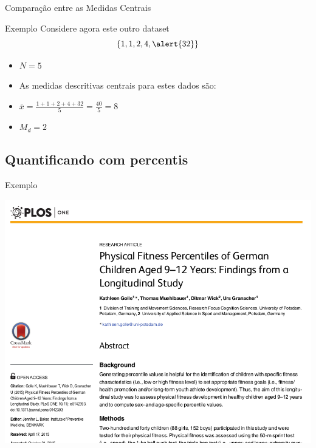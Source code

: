 \documentclass{beamer}
\begin{document}
\begin{frame}{\scriptsize Comparação entre as Medidas Centrais}
  \begin{exampleblock}{Exemplo}
    \footnotesize
    Considere agora este outro dataset $$\{
    1,1,2,4,\alert{32} \}$$
  \begin{itemize}
    \footnotesize
  \item $N=5$
  \item As medidas descritivas centrais para estes dados são:
  \item $\bar{x} = \frac{1+1+2+4+32}{5} = \frac{40}{5}= 8$
  \item $M_d = 2$
  \end{itemize}
\end{exampleblock}
\end{frame}

\subsection{Quantificando com percentis}

\begin{frame}{\scriptsize Exemplo}
  \begin{center}
    \includegraphics[height=\textheight]{Cap3/percentil0}
  \end{center}
\end{frame}
\end{document}
